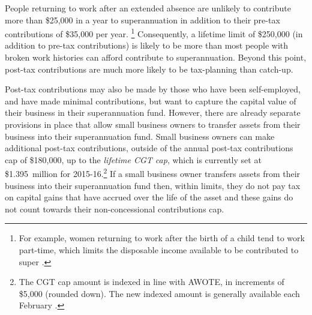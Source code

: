 People returning to work after an extended absence are unlikely to contribute more than \$25,000 in a year to superannuation in addition to their pre-tax contributions of \$35,000 per year.%
\footnote{For example, women returning to work after the birth of a child tend to work part-time, which limits the disposable income available to be contributed to super \textcite[][222]{ProductivityCommission2009PaidParentalLeave}.} %
Consequently, a lifetime limit of \$250,000 (in addition to pre-tax contributions) is likely to be more than most people with broken work histories can afford contribute to superannuation. Beyond this point, post-tax contributions are much more likely to be tax-planning than catch-up. 

Post-tax contributions may also be made by those who have been self-employed, and have made minimal contributions, but want to capture the capital value of their business in their superannuation fund. However, there are already separate provisions in place that allow small business owners to transfer assets from their business into their superannuation fund. Small business owners can make additional post-tax contributions, outside of the annual post-tax contributions cap of \$180,000, up to the \emph{lifetime CGT cap}\label{paragraph:SUPER-lifetime-CGT-cap}, which is currently set at \$1.395~million for 2015-16.\footnote{The CGT cap amount is indexed in line with AWOTE, in increments of \$5,000 (rounded down). The new indexed amount is generally available each February \textcite{ATO2015CGT-cap-amount}.}  If a small business owner transfers assets from their business into their superannuation fund then, within limits, they do not pay tax on capital gains that have accrued over the life of the asset and these gains do not count towards their non-concessional contributions cap.%
\label{fn:172}

